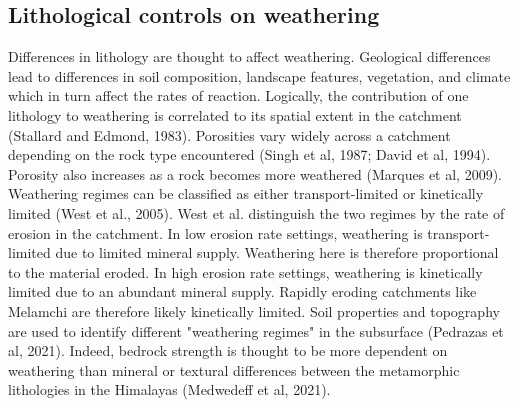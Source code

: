 




\subsection{Lithological controls on weathering}

Differences in lithology are thought to affect weathering. Geological differences lead to differences in soil composition, landscape features, vegetation, and climate which in turn affect the rates of reaction. Logically, the contribution of one lithology to weathering is correlated to its spatial extent in the catchment (Stallard and Edmond, 1983). Porosities vary widely across a catchment depending on the rock type encountered (Singh et al, 1987; David et al, 1994). Porosity also increases as a rock becomes more weathered (Marques et al, 2009). Weathering regimes can be classified as either transport-limited or kinetically limited (West et al., 2005). West et al. distinguish the two regimes by the rate of erosion in the catchment. In low erosion rate settings, weathering is transport-limited due to limited mineral supply. Weathering here is therefore proportional to the material eroded. In high erosion rate settings, weathering is kinetically limited due to an abundant mineral supply. Rapidly eroding catchments like Melamchi are therefore likely kinetically limited. Soil properties and topography are used to identify different "weathering regimes" in the subsurface (Pedrazas et al, 2021). Indeed, bedrock strength is thought to be more dependent on weathering than mineral or textural differences between the metamorphic lithologies in the Himalayas (Medwedeff et al, 2021).

